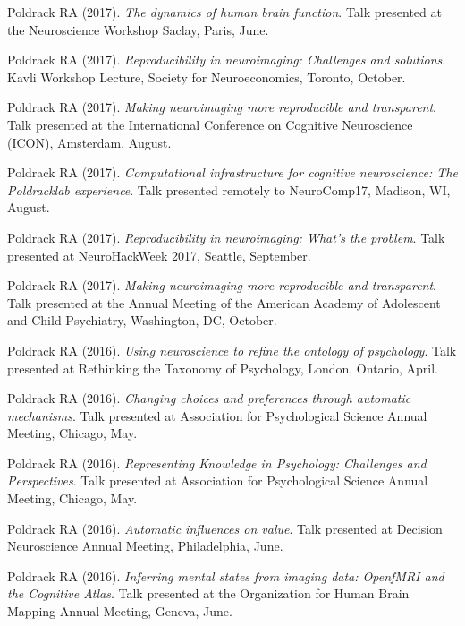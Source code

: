 \documentclass[10pt, letterpaper]{article}
\begin{document}
Poldrack RA (2017). \emph{The dynamics of human brain function}. Talk presented at the Neuroscience Workshop Saclay, Paris, June. \vspace{2mm}

Poldrack RA (2017). \emph{Reproducibility in neuroimaging: Challenges and solutions}. Kavli Workshop Lecture, Society for Neuroeconomics, Toronto, October. \vspace{2mm}

Poldrack RA (2017). \emph{Making neuroimaging more reproducible and transparent}. Talk presented at the International Conference on Cognitive Neuroscience (ICON), Amsterdam, August. \vspace{2mm}

Poldrack RA (2017). \emph{Computational infrastructure for cognitive neuroscience: The Poldracklab experience}. Talk presented remotely to NeuroComp17, Madison, WI, August. \vspace{2mm}

Poldrack RA (2017). \emph{Reproducibility in neuroimaging: What's the problem}. Talk presented at NeuroHackWeek 2017, Seattle, September. \vspace{2mm}

Poldrack RA (2017). \emph{Making neuroimaging more reproducible and transparent}. Talk presented at the Annual Meeting of the American Academy of Adolescent and Child Psychiatry, Washington, DC, October. \vspace{2mm}

Poldrack RA (2016). \emph{Using neuroscience to refine the ontology of psychology}. Talk presented at Rethinking the Taxonomy of Psychology, London, Ontario, April. \vspace{2mm}

Poldrack RA (2016). \emph{Changing choices and preferences through automatic mechanisms}. Talk presented at Association for Psychological Science Annual Meeting, Chicago, May. \vspace{2mm}

Poldrack RA (2016). \emph{Representing Knowledge in Psychology: Challenges and Perspectives}. Talk presented at Association for Psychological Science Annual Meeting, Chicago, May. \vspace{2mm}

Poldrack RA (2016). \emph{Automatic influences on value}. Talk presented at Decision Neuroscience Annual Meeting, Philadelphia, June. \vspace{2mm}

Poldrack RA (2016). \emph{Inferring mental states from imaging data: OpenfMRI and the Cognitive Atlas}. Talk presented at the Organization for Human Brain Mapping Annual Meeting, Geneva, June. \vspace{2mm}
\end{document}
